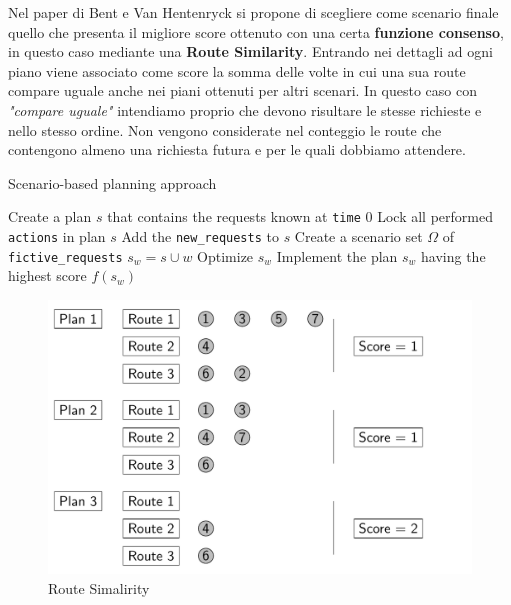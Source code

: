 \documentclass[
    article,            %
    12pt,                %
    oneside,            %
    a4paper,            %
    english,            %
    italian,                %
    sumario=tradicional,
]{abntex2}
\begin{document}
Nel paper di Bent e Van Hentenryck\cite{SBPPDVR} si propone di scegliere come scenario finale quello che presenta il migliore score ottenuto con una certa \textbf{funzione consenso}, in questo caso mediante una \textbf{Route Similarity}. Entrando nei dettagli ad ogni piano viene associato come score la somma delle volte in cui una sua route compare uguale anche nei piani ottenuti per altri scenari. In questo caso con \textit{"compare uguale"} intendiamo proprio che devono risultare le stesse richieste e nello stesso ordine. Non vengono considerate nel conteggio le route che contengono almeno una richiesta futura e per le quali dobbiamo attendere.

\begin{algorithm}
    \caption{Scenario-based planning approach}
    \label{alg:SBPA}
    \begin{algorithmic}
        \State Create a plan $s$ that contains the requests known at \texttt{time} $0$
            \State Lock all performed \texttt{actions} in plan $s$
            \State Add the \texttt{new\_requests} to $s$
            \State Create a scenario set $\Omega$ of \texttt{fictive\_requests}
                \State $s_w = s \cup w$
                \State Optimize $s_w$
            \EndFor
            \State Implement the plan $s_w$ having the highest score $f(s_w)$
        \EndWhile
    \end{algorithmic}
\end{algorithm}

\begin{figure}
    \centering
    \includegraphics[scale=0.30]{Images/RouteSimilarity.png}
    \caption{Route Simalirity}
    \label{fig:RouteSimilarity}
\end{figure}
\end{document}
